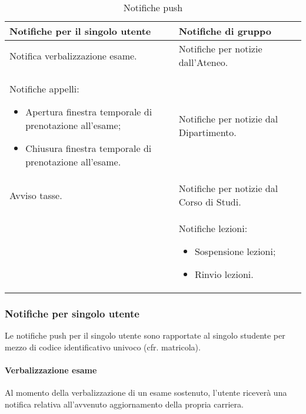\begin{table}
\small %
\caption{Notifiche push} %
\label{tab:gruppo-2-notifiche-push} %
\begin{tabular}{| p{} | p{} |}
	\hline
	\textbf{Notifiche per il singolo utente} & \textbf{Notifiche di gruppo} \\
	\hline
	Notifica verbalizzazione esame. & Notifiche per notizie dall'Ateneo. \\
	\hline
	Notifiche appelli:
	\begin{itemize}[noitemsep,topsep=0pt,parsep=0pt,partopsep=0pt]
	\item Apertura finestra temporale di prenotazione all'esame;
	\item Chiusura finestra temporale di prenotazione all'esame.
	\end{itemize} &
	Notifiche per notizie dal Dipartimento. \\
	\hline
	Avviso tasse. & Notifiche per notizie dal Corso di Studi. \\
	\hline
	& Notifiche lezioni:
	\begin{itemize}[noitemsep,topsep=0pt,parsep=0pt,partopsep=0pt]
	\item Sospensione lezioni;
	\item Rinvio lezioni.
	\end{itemize} \\
	\hline
\end{tabular}
\end{table}

\subsubsection{Notifiche per singolo utente}

Le notifiche push per il singolo utente sono rapportate al singolo studente per mezzo di codice identificativo univoco (cfr. matricola).

\paragraph{Verbalizzazione esame\\}

Al momento della verbalizzazione di un esame sostenuto, l’utente riceverà una notifica relativa all’avvenuto aggiornamento della propria carriera.


